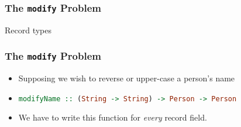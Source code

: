 \begin{frame}
\frametitle{The \lstinline$modify$ Problem}

\begin{block}{Record types}

\end{block}

\end{frame}

\begin{frame}
\frametitle{The \lstinline$modify$ Problem}

\begin{itemize}
\item Supposing we wish to reverse or upper-case a person's name
\item \lstinline[language=haskell]$modifyName :: (String -> String) -> Person -> Person$
\item We have to write this function for \emph{every} record field.
\end{itemize}

\end{frame}

